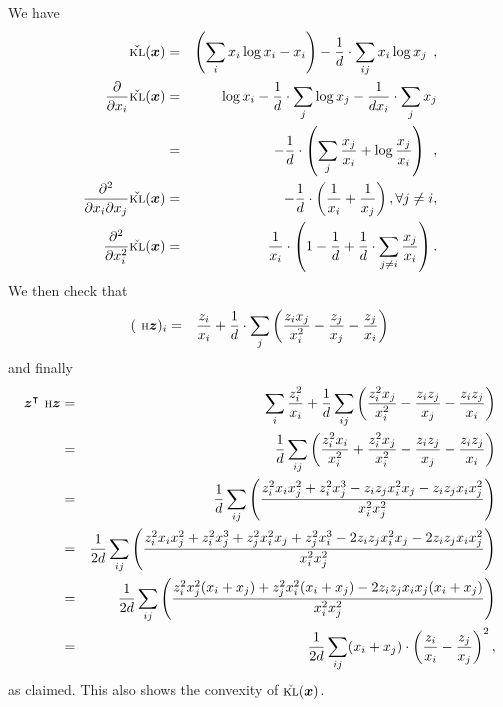 We have
\begin{eqnarray}
\check{{\textsc{kl}}}(\bm{x}) & = & \left(\sum_i x_i\log x_i - x_i\right) - \frac{1}{d}
\cdot \sum_{ij} x_i \log x_j
\:\:,\\
\frac{\partial}{\partial x_i} \check{{\textsc{kl}}}(\bm{x}) & = & \log x_i -
\frac{1}{d} \cdot \sum_j \log x_j -\frac{1}{d x_i} \cdot \sum_j x_j
\\
 & = & -\frac{1}{d}\cdot \left(\sum_j \frac{x_j}{x_i} + \log \frac{x_j}{x_i} \right)\:\:,\label{eq:grad}\\
\frac{\partial^2}{\partial x_i \partial x_j} \check{{\textsc{kl}}}(\bm{x}) & = &
-\frac{1}{d} \cdot \left( \frac{1}{x_i} + \frac{1}{x_j} \right), \forall j\neq i,\\
\frac{\partial^2}{\partial x_i^2} \check{{\textsc{kl}}}(\bm{x}) & = &
\frac{1}{x_i}\cdot \left( 1 - \frac{1}{d} + \frac{1}{d}\cdot
  \sum_{j\neq i}\frac{x_j}{x_i}\right).
\end{eqnarray}
We then check that
\begin{eqnarray}
(\hessian \ve{z})_i & = & \frac{z_i}{x_i} + \frac{1}{d} \cdot \sum_j
\left(\frac{z_i x_j}{x_i^2} - \frac{z_j}{x_j} - \frac{z_j}{x_i}\right)
\end{eqnarray}
and finally
\begin{eqnarray}
\ve{z}^\top \hessian \ve{z} & = & \sum_i \frac{z^2_i}{x_i} +
\frac{1}{d}\sum_{ij}\left(\frac{z_i^2x_j}{x_i^2} - \frac{z_iz_j}{x_j}
  - \frac{z_i z_j}{x_i}\right) \nonumber\\
 & = & \frac{1}{d}\sum_{ij}\left(\frac{z_i^2x_i}{x_i^2} + \frac{z_i^2x_j}{x_i^2} - \frac{z_iz_j}{x_j}
  - \frac{z_i z_j}{x_i}\right) \nonumber\\
 & = & \frac{1}{d}\sum_{ij}\left(\frac{z_i^2x_ix_j^2 + z_i^2x_j^3-z_iz_jx_i^2x_j-z_iz_jx_ix_j^2}{x_i^2x_j^2}\right) \nonumber\\
 & = & \frac{1}{2d}\sum_{ij}\left(\frac{z_i^2x_ix_j^2 + z_i^2x_j^3+z_j^2x^2_ix_j + z_j^2x_i^3-2z_iz_jx_i^2x_j-2z_iz_jx_ix_j^2}{x_i^2x_j^2}\right) \nonumber\\
 & = & \frac{1}{2d}\sum_{ij}\left(\frac{z_i^2x_j^2(x_i+x_j) + z_j^2x^2_i(x_i+x_j) -2z_iz_jx_ix_j(x_i+x_j)}{x_i^2x_j^2}\right) \nonumber\\
 & = & \frac{1}{2d}\sum_{ij}(x_i+x_j)\cdot \left(\frac{z_i}{x_i}-\frac{z_j}{x_j}\right)^2,
\end{eqnarray}
as claimed. This also shows the convexity of $\check{{\textsc{kl}}}(\bm{x})$.

